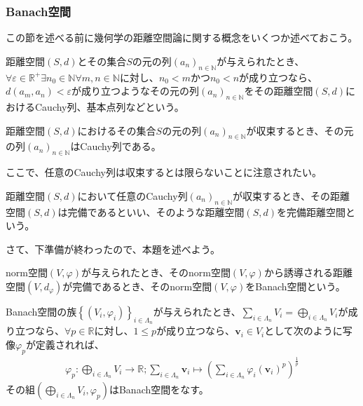 \documentclass[dvipdfmx]{jsarticle}
\begin{document}
\subsubsection{Banach空間}%
この節を述べる前に幾何学の距離空間論に関する概念をいくつか述べておこう。
\begin{dfn}[Cauchy列]
距離空間$(S,d)$とその集合$S$の元の列$\left( a_{n} \right)_{n \in \mathbb{N}}$が与えられたとき、$\forall\varepsilon \in \mathbb{R}^{+}\exists n_{0} \in \mathbb{N}\forall m,n \in \mathbb{N}$に対し、$n_{0} < m$かつ$n_{0} < n$が成り立つなら、$d\left( a_{m},a_{n} \right) < \varepsilon$が成り立つようなその元の列$\left( a_{n} \right)_{n \in \mathbb{N}}$をその距離空間$(S,d)$におけるCauchy列、基本点列などという。
\end{dfn}
\begin{thm}[収束列はCauchy列である]
距離空間$(S,d)$におけるその集合$S$の元の列$\left( a_{n} \right)_{n \in \mathbb{N}}$が収束するとき、その元の列$\left( a_{n} \right)_{n \in \mathbb{N}}$はCauchy列である。
\end{thm}\par
ここで、任意のCauchy列は収束するとは限らないことに注意されたい。
\begin{dfn}[完備距離空間]
距離空間$(S,d)$において任意のCauchy列$\left( a_{n} \right)_{n \in \mathbb{N}}$が収束するとき、その距離空間$(S,d)$は完備であるといい、そのような距離空間$(S,d)$を完備距離空間という。
\end{dfn}\par
さて、下準備が終わったので、本題を述べよう。
\begin{dfn}[Banach空間]
norm空間$(V,\varphi)$が与えられたとき、そのnorm空間$(V,\varphi)$から誘導される距離空間$\left( V,d_{\varphi} \right)$が完備であるとき、そのnorm空間$(V,\varphi)$をBanach空間という。
\end{dfn}
\begin{thm}\label{2.3.1.12}
Banach空間の族$\left\{ \left( V_{i},\varphi_{i} \right) \right\}_{i \in \varLambda_{n}}$が与えられたとき、$\sum_{i \in \varLambda_{n}} V_{i} = \bigoplus_{i \in \varLambda_{n}} V_{i}$が成り立つなら、$\forall p \in \mathbb{R}$に対し、$1 \leq p$が成り立つなら、$\mathbf{v}_{i} \in V_{i}$として次のように写像$\varphi_{p}$が定義されれば、
\begin{align*}
\varphi_{p}:\bigoplus_{i \in \varLambda_{n}} V_{i} \rightarrow \mathbb{R};\sum_{i \in \varLambda_{n}} \mathbf{v}_{i} \mapsto \left( \sum_{i \in \varLambda_{n}} {\varphi_{i}\left( \mathbf{v}_{i} \right)}^{p} \right)^{\frac{1}{p}}
\end{align*}
その組$\left( \bigoplus_{i \in \varLambda_{n}} V_{i},\varphi_{p} \right)$はBanach空間をなす。
\end{thm}
\end{document}
